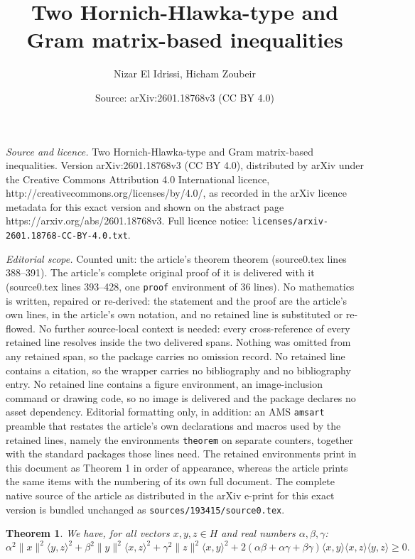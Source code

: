 \documentclass[10pt,a4paper]{amsart}
\title{Two Hornich-Hlawka-type and Gram matrix-based inequalities}
\author{Nizar El Idrissi, Hicham Zoubeir}
\date{Source: arXiv:2601.18768v3 (CC BY 4.0)}
\newtheorem{theorem}{Theorem}
\begin{document}
\maketitle

\noindent\emph{Source and licence.} Two Hornich-Hlawka-type and Gram matrix-based inequalities. Version arXiv:2601.18768v3 (CC BY 4.0), distributed by arXiv under the Creative Commons Attribution 4.0 International licence, http://creativecommons.org/licenses/by/4.0/, as recorded in the arXiv licence metadata for this exact version and shown on the abstract page https://arxiv.org/abs/2601.18768v3. Full licence notice: \texttt{licenses/arxiv-2601.18768-CC-BY-4.0.txt}.\par\smallskip

\noindent\textit{Editorial scope.} Counted unit: the article's theorem theorem (source0.tex lines 388--391). The article's complete original proof of it is delivered with it (source0.tex lines 393--428, one \texttt{proof} environment of 36 lines). No mathematics is written, repaired or re-derived: the statement and the proof are the article's own lines, in the article's own notation, and no retained line is substituted or re-flowed.  No further source-local context is needed: every cross-reference of every retained line resolves inside the two delivered spans.  Nothing was omitted from any retained span, so the package carries no omission record.  No retained line contains a citation, so the wrapper carries no bibliography and no bibliography entry.  No retained line contains a figure environment, an image-inclusion command or drawing code, so no image is delivered and the package declares no asset dependency.  Editorial formatting only, in addition: an AMS \texttt{amsart} preamble that restates the article's own declarations and macros used by the retained lines, namely the environments \texttt{theorem} on separate counters, together with the standard packages those lines need.  The retained environments print in this document as Theorem 1 in order of appearance, whereas the article prints the same items with the numbering of its own full document.  The complete native source of the article as distributed in the arXiv e-print for this exact version is bundled unchanged as \texttt{sources/193415/source0.tex}.
\begin{theorem}
We have, for all vectors $x,y,z \in H$ and real numbers $\alpha,\beta,\gamma$:
\[ \alpha^2  \|x\|^2 \langle y, z \rangle^2 + \beta^2 \|y\|^2 \langle x, z \rangle^2 + \gamma^2 \|z\|^2 \langle x, y \rangle^2  + 2  (\alpha\beta + \alpha\gamma + \beta\gamma) \langle x, y\rangle \langle x, z\rangle \langle y, z\rangle \geq 0. \]
\end{theorem}
\end{document}
